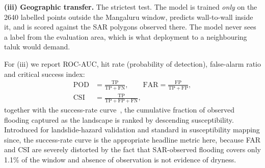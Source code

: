 \documentclass[10pt,twocolumn]{article}
\begin{document}
\textbf{(iii) Geographic transfer.} The strictest test. The model is trained
\emph{only} on the \num{2640} labelled points outside the Mangaluru window,
predicts wall-to-wall inside it, and is scored against the SAR polygons observed
there. The model never sees a label from the evaluation area, which is what
deployment to a neighbouring taluk would demand.

For (iii) we report ROC-AUC, hit rate (probability of detection),
false-alarm ratio and critical success index:
\begin{equation}
\begin{aligned}
\mathrm{POD}&=\tfrac{\mathrm{TP}}{\mathrm{TP}+\mathrm{FN}}, \qquad
\mathrm{FAR}=\tfrac{\mathrm{FP}}{\mathrm{TP}+\mathrm{FP}}, \\[2pt]
\mathrm{CSI}&=\tfrac{\mathrm{TP}}{\mathrm{TP}+\mathrm{FP}+\mathrm{FN}},
\end{aligned}
\label{eq:contingency}
\end{equation}
together with the success-rate curve~\citep{chung2003}, the cumulative fraction
of observed flooding captured as the landscape is ranked by descending
susceptibility. Introduced for landslide-hazard validation and standard in
susceptibility mapping since, the success-rate curve is the appropriate headline
metric here, because FAR and CSI
are severely distorted by the fact that SAR-observed flooding covers only 1.1\%
of the window and absence of observation is not evidence of dryness.
\end{document}
